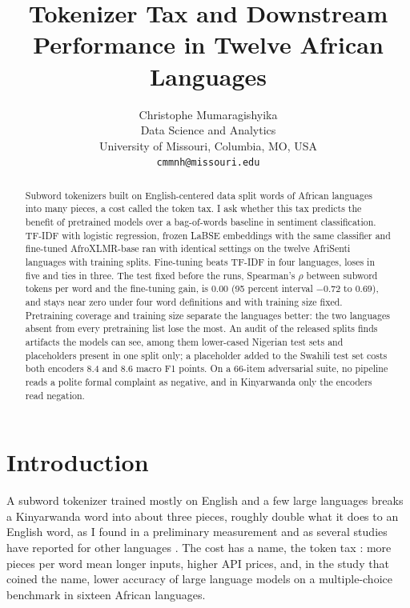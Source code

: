 \documentclass[11pt]{article}
\begin{document}
\title{Tokenizer Tax and Downstream Performance in Twelve African Languages}

\author{Christophe Mumaragishyika \\
  Data Science and Analytics \\
  University of Missouri, Columbia, MO, USA \\
  \texttt{cmmnh@missouri.edu}}

\maketitle

\begin{abstract}
Subword tokenizers built on English-centered data split words of African languages into many pieces, a cost called the token tax. I ask whether this tax predicts the benefit of pretrained models over a bag-of-words baseline in sentiment classification. TF-IDF with logistic regression, frozen LaBSE embeddings with the same classifier and fine-tuned AfroXLMR-base ran with identical settings on the twelve AfriSenti languages with training splits. Fine-tuning beats TF-IDF in four languages, loses in five and ties in three. The test fixed before the runs, Spearman's $\rho$ between subword tokens per word and the fine-tuning gain, is 0.00 (95 percent interval $-0.72$ to $0.69$), and stays near zero under four word definitions and with training size fixed. Pretraining coverage and training size separate the languages better: the two languages absent from every pretraining list lose the most. An audit of the released splits finds artifacts the models can see, among them lower-cased Nigerian test sets and placeholders present in one split only; a placeholder added to the Swahili test set costs both encoders 8.4 and 8.6 macro F1 points. On a 66-item adversarial suite, no pipeline reads a polite formal complaint as negative, and in Kinyarwanda only the encoders read negation.
\end{abstract}

\section{Introduction}
A subword tokenizer trained mostly on English and a few large languages breaks a Kinyarwanda word into about three pieces, roughly double what it does to an English word, as I found in a preliminary measurement and as several studies have reported for other languages \citep{rust2021tokenizer,petrov2023unfairness,ahia2023cost}. The cost has a name, the token tax \citep{lundin2026tokentax}: more pieces per word mean longer inputs, higher API prices, and, in the study that coined the name, lower accuracy of large language models on a multiple-choice benchmark in sixteen African languages.
\end{document}
